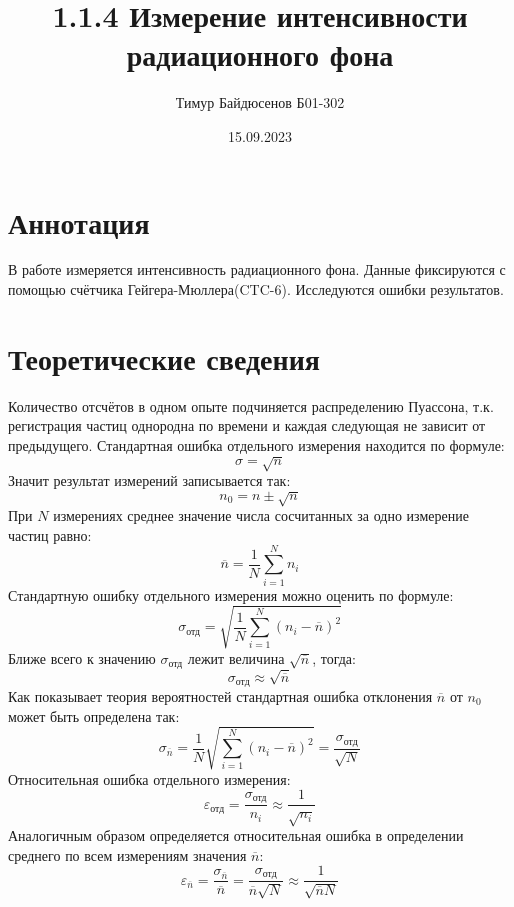 \documentclass[a4paper,12pt]{article}
\title{1.1.4 Измерение интенсивности радиационного фона}
\author{Тимур Байдюсенов Б01-302}
\date{15.09.2023}
\begin{document}
\maketitle

\section{Аннотация}
В работе измеряется интенсивность радиационного фона. Данные фиксируются с помощью счётчика Гейгера-Мюллера(CTC-6). Исследуются ошибки результатов.

\section{Теоретические сведения}
Количество отсчётов в одном опыте подчиняется распределению Пуассона, т.к. регистрация частиц однородна по времени и каждая следующая не зависит от предыдущего.
Стандартная ошибка отдельного измерения находится по формуле:
\begin{equation}
\sigma=\sqrt{n}
\end{equation}
Значит результат измерений записывается так:
\begin{equation}
n_0=n\pm\sqrt{n}
\end{equation}
При $N$ измерениях среднее значение числа сосчитанных за одно измерение частиц равно:
\begin{equation}
\overline{n}=\frac{1}{N}\sum_{i=1}^{N} {n_i}
\end{equation}
Стандартную ошибку отдельного измерения можно оценить по формуле:
\begin{equation}
\sigma_{\mbox{отд}}=\sqrt{\frac{1}{N}\sum_{i=1}^{N}{(n_i-\overline{n})^2}}
\end{equation}
Ближе всего к значению $ \sigma_{\mbox{отд}} $ лежит величина $ \sqrt{\overline{n}} $, тогда:
\begin{equation}
\sigma_{\mbox{отд}} \approx \sqrt{{\overline{n}}}
\end{equation}
Как показывает теория вероятностей стандартная ошибка отклонения $\overline{n}$ от $n_0$ может быть определена так:
\begin{equation}
\sigma_{\overline{n}}=\frac{1}{N}\sqrt{\sum_{i=1}^N{(n_i-\overline{n})^2}}=\frac{\sigma_{\mbox{отд}}}{\sqrt{N}}
\end{equation}
Относительная ошибка отдельного измерения:
\begin{equation}
\varepsilon_{\mbox{отд}}=\frac{\sigma_{\mbox{отд}}}{n_i} \approx \frac{1}{\sqrt{n_i}}
\end{equation}
Аналогичным образом определяется относительная ошибка в определении среднего по всем измерениям значения $\overline{n}$:
\begin{equation}
\varepsilon_{\overline{n}}=\frac{\sigma_{\overline{n}}}{\overline{n}}=\frac{\sigma_{\mbox{отд}}}{\overline{n}\sqrt{N}}\approx\frac{1}{\sqrt{\overline{n}N}}
\end{equation}
\end{document}
